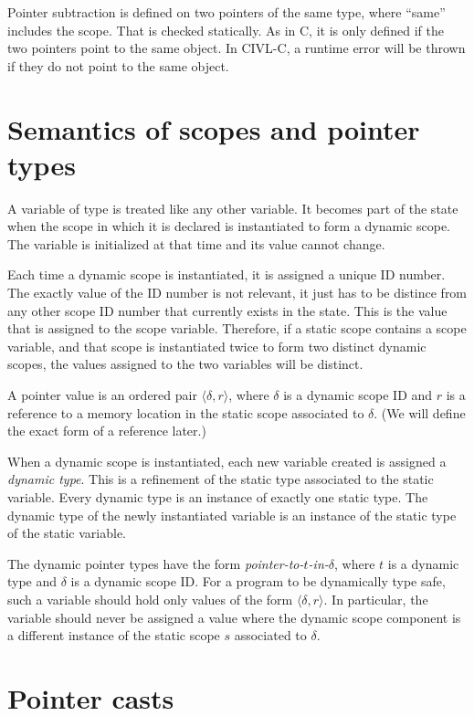 Pointer subtraction is defined on two pointers of the same type, where
``same'' includes the scope.  That is checked statically.  As in C, it
is only defined if the two pointers point to the same object.  In
CIVL-C, a runtime error will be thrown if they do not point to the
same object.

\section{Semantics of scopes and pointer types}

A variable of type \cscope{} is treated like any other variable.
It becomes part of the state when the scope in which it is declared
is instantiated to form a dynamic scope.  The variable is 
initialized  at that time and its value cannot change.

Each time a dynamic scope is instantiated, it is assigned a unique ID
number.  The exactly value of the ID number is not relevant, it just
has to be distince from any other scope ID number that currently
exists in the state.  This is the value that is assigned to the scope
variable.  Therefore, if a static scope contains a scope variable, and
that scope is instantiated twice to form two distinct dynamic scopes,
the values assigned to the two variables will be distinct.

A pointer value is an ordered pair $\langle \delta,r \rangle$, where
$\delta$ is a dynamic scope ID and $r$ is a reference to a memory
location in the static scope associated to $\delta$.  (We will define
the exact form of a reference later.)

When a dynamic scope is instantiated, each new variable created is
assigned a \emph{dynamic type}.  This is a refinement of the static
type associated to the static variable.   Every dynamic type
is an instance of exactly one static type.  The dynamic
type of the newly instantiated variable is an instance of the
static type of the static variable.

The dynamic pointer types have the form
\emph{pointer-to-$t$-in-$\delta$}, where $t$ is a dynamic type and
$\delta$ is a dynamic scope ID.  For a program to be dynamically type
safe, such a variable should hold only values of the form $\langle
\delta, r\rangle$.  In particular, the variable should never be
assigned a value where the dynamic scope component is a different
instance of the static scope $s$ associated to $\delta$.

\section{Pointer casts}

